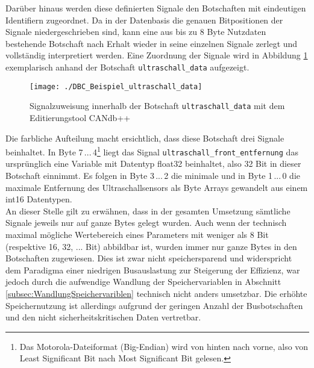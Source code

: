 Darüber hinaus werden diese definierten Signale den Botschaften mit eindeutigen Identifiern zugeordnet. Da in der Datenbasis die genauen Bitpositionen der Signale niedergeschrieben sind, kann eine aus bis zu 8 Byte Nutzdaten bestehende Botschaft nach Erhalt wieder in seine einzelnen Signale zerlegt und vollständig interpretiert werden. Eine Zuordnung der Signale wird in Abbildung \ref{abb:DBCultraschall_data} exemplarisch anhand der Botschaft \texttt{ultraschall\_data} aufgezeigt.

\begin{figure}[!hbt]
	\centering
	\texttt{[image: ./DBC\_Beispiel\_ultraschall\_data]}
	\caption{Signalzuweisung innerhalb der Botschaft \texttt{ultraschall\_data} mit dem Editierungstool CANdb++}
	\label{abb:DBCultraschall_data}
\end{figure} 

Die farbliche Aufteilung macht ersichtlich, dass diese Botschaft drei Signale beinhaltet. In Byte 7\,...\,4\footnote{Das Motorola-Dateiformat (Big-Endian) wird \glqq von hinten nach vorne\grqq{}, also von Least Significant Bit nach Most Significant Bit gelesen.} liegt das Signal \texttt{ultraschall\_front\_entfernung} das ursprünglich eine Variable mit Datentyp float32 beinhaltet, also 32 Bit in dieser Botschaft einnimmt. Es folgen in Byte 3\,...\,2 die minimale und in Byte 1\,...\,0 die maximale Entfernung des Ultraschallsensors als Byte Arrays gewandelt aus einem int16 Datentypen.\\
An dieser Stelle gilt zu erwähnen, dass in der gesamten Umsetzung sämtliche Signale jeweils nur auf ganze Bytes gelegt wurden. Auch wenn der technisch maximal mögliche Wertebereich eines Parameters mit weniger als 8 Bit (respektive 16, 32, ... Bit) abbildbar ist, wurden immer nur ganze Bytes in den Botschaften zugewiesen. Dies ist zwar nicht speichersparend und widerspricht dem Paradigma einer niedrigen Busauslastung zur Steigerung der Effizienz, war jedoch durch die aufwendige Wandlung der Speichervariablen in Abschnitt \ref{subsec:WandlungSpeichervariblen} technisch nicht anders umsetzbar. Die erhöhte Speichernutzung ist allerdings aufgrund der geringen Anzahl der Busbotschaften und den nicht sicherheitskritischen Daten vertretbar.

